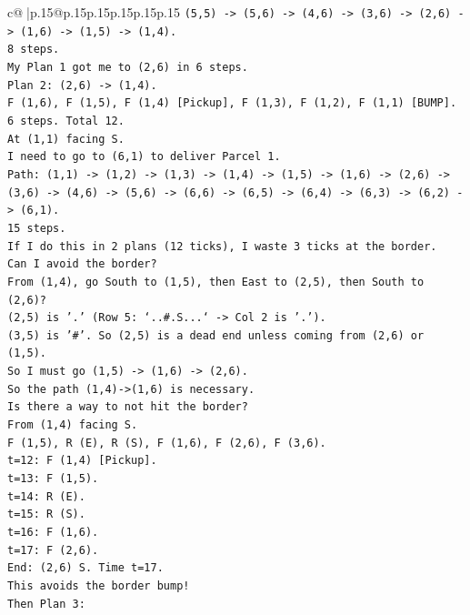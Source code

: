 \documentclass{article}
\begin{document}
{\begin{supertabular}{c@{$\;$}|p{.15\linewidth}@{}p{.15\linewidth}p{.15\linewidth}p{.15\linewidth}p{.15\linewidth}p{.15\linewidth}}
{{{\texttt{(5,5) {-}> (5,6) {-}> (4,6) {-}> (3,6) {-}> (2,6) {-}> (1,6) {-}> (1,5) {-}> (1,4).} \\
\texttt{8 steps.} \\
\texttt{My Plan 1 got me to (2,6) in 6 steps.} \\
\texttt{Plan 2: (2,6) {-}> (1,4).} \\
\texttt{F (1,6), F (1,5), F (1,4) {[}Pickup{]}, F (1,3), F (1,2), F (1,1) {[}BUMP{]}.} \\
\texttt{6 steps. Total 12.} \\
\texttt{At (1,1) facing S.} \\
\texttt{I need to go to (6,1) to deliver Parcel 1.} \\
\texttt{Path: (1,1) {-}> (1,2) {-}> (1,3) {-}> (1,4) {-}> (1,5) {-}> (1,6) {-}> (2,6) {-}> (3,6) {-}> (4,6) {-}> (5,6) {-}> (6,6) {-}> (6,5) {-}> (6,4) {-}> (6,3) {-}> (6,2) {-}> (6,1).} \\
\texttt{15 steps.} \\
\texttt{If I do this in 2 plans (12 ticks), I waste 3 ticks at the border.} \\
\texttt{Can I avoid the border?} \\
\texttt{From (1,4), go South to (1,5), then East to (2,5), then South to (2,6)?} \\
\texttt{(2,5) is '.' (Row 5: `..\#.S...` {-}> Col 2 is '.').} \\
\texttt{(3,5) is '\#'. So (2,5) is a dead end unless coming from (2,6) or (1,5).} \\
\texttt{So I must go (1,5) {-}> (1,6) {-}> (2,6).} \\
\texttt{So the path (1,4){-}>(1,6) is necessary.} \\
\texttt{Is there a way to not hit the border?} \\
\texttt{From (1,4) facing S.} \\
\texttt{F (1,5), R (E), R (S), F (1,6), F (2,6), F (3,6).} \\
\texttt{t=12: F (1,4) {[}Pickup{]}.} \\
\texttt{t=13: F (1,5).} \\
\texttt{t=14: R (E).} \\
\texttt{t=15: R (S).} \\
\texttt{t=16: F (1,6).} \\
\texttt{t=17: F (2,6).} \\
\texttt{End: (2,6) S. Time t=17.} \\
\texttt{This avoids the border bump!} \\
\texttt{Then Plan 3:} \\
}}}
\end{supertabular}}
\end{document}
